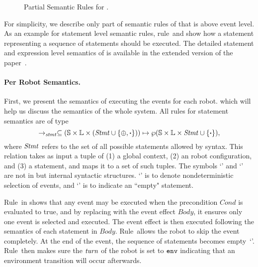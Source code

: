 \begin{figure}
\begin{mathpar}
%
\end{mathpar}
\caption{Partial Semantic Rules for \lgname.}\label{fig:partial-semantics}
\end{figure}

For simplicity, we describe only part of semantic rules of \lgname that is above event level.
As an example for statement level semantic rules,
rule~\StmtSeqRuleOne and \StmtSeqRuleTwo show how a statement representing a sequence of statements should be executed.
The detailed statement and expression level semantics of \lgname is available in the extended version of the paper~\cite{}.

\paragraph{Per Robot Semantics.}
First, we present the semantics of executing the events for each robot.
which will help us discuss the semantics of the whole system.
All rules for statement semantics are of type
\[
\stmtrule \subseteq (\pws \times \pwl\times (\pwstmt \cup \{\SelectEvent, \EndEvent\})) \mapsto \wp(\pws\times \pwl \times \pwstmt\cup \{\EndEvent\}),
\]
where $\pwstmt$ refers to the set of all possible statements allowed by \lgname syntax.
This relation takes as input a tuple of (1) a global context, (2) an robot configuration, and (3) a statement,
and maps it to a set of such tuples.
The symbols `\SelectEvent' and `\EndEvent' are not in \lgname but internal syntactic structures.
`\SelectEvent' is to denote nondeterministic selection of events,
and `\EndEvent' is to indicate an ``empty" statement.

Rule~\SelectEventRule in  shows that any event may be executed when the precondition $Cond$ is evaluated to true,
and by replacing \SelectEvent with the event effect $\mathit{Body}$, it ensures only one event is selected and executed.
The event effect is then executed following the semantics of each statement in $\mathit{Body}$.
Rule~\SkipEventRule allows the robot to skip the event completely.
At the end of the event, the sequence of statements becomes empty~`\EndEvent'.
Rule~\EndEventRule then makes sure the $\turn$ of the robot is set to $\env$ indicating that
an environment transition will occur afterwards.

